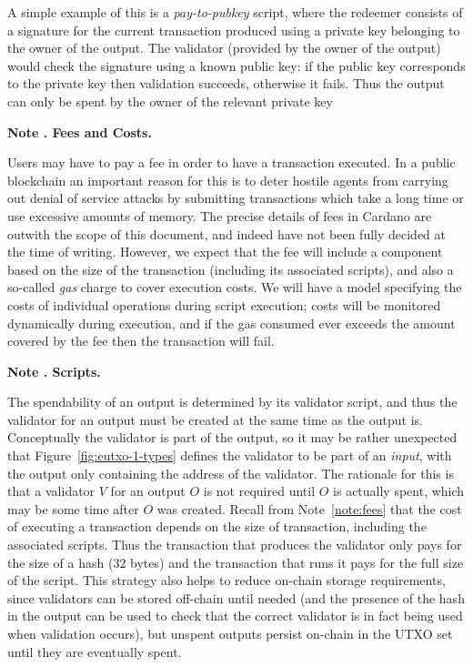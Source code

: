 \documentclass[a4paper]{article}
\newcounter{note}
\newcommand{\note}[1]{
  \bigskip
  \refstepcounter{note}
  \noindent\textbf{Note \thenote. #1}
}
\renewcommand{\i}{\textit}  %
\begin{document}
A simple example of this is a \i{pay-to-pubkey} script, where the
redeemer consists of a signature for the current transaction produced
using a private key belonging to the owner of the output.  The
validator (provided by the owner of the output) would check the
signature using a known public key: if the public key corresponds to
the private key then validation succeeds, otherwise it fails.  Thus
the output can only be spent by the owner of the relevant private key


\note{Fees and Costs.}
\label{note:fees}
Users may have to pay a fee in order to have a transaction executed.
In a public blockchain an important reason for this is to deter
hostile agents from carrying out denial of service attacks by
submitting transactions which take a long time or use excessive
amounts of memory.  The precise details of fees in Cardano are outwith
the scope of this document, and indeed have not been fully decided at
the time of writing. However, we expect that the fee will include a
component based on the size of the transaction (including its
associated scripts), and also a so-called \textit{gas} charge to cover
execution costs.  We will have a model specifying the costs of
individual operations during script execution; costs will be monitored
dynamically during execution, and if the gas consumed ever exceeds the
amount covered by the fee then the transaction will fail.

\note{Scripts.}
\label{note:scripts} The spendability of an output is determined by
its validator script, and thus the validator for an output must be
created at the same time as the output is.  Conceptually the validator
is  part of the output, so it may be rather unexpected that
Figure~\ref{fig:eutxo-1-types} defines the validator to be part of an
\textit{input}, with the output only containing the address of the
validator.  The rationale for this is that a validator $V$ for an
output $O$ is not required until $O$ is actually spent, which may be
some time after $O$ was created.  Recall from Note~\ref{note:fees} that the
cost of executing a transaction depends on the size of transaction,
including the associated scripts.  Thus the transaction that produces
the validator only pays for the size of a hash (32 bytes) and the
transaction that runs it pays for the full size of the script. This
strategy also helps to reduce on-chain storage requirements, since
validators can be stored off-chain until needed (and the presence of
the hash in the output can be used to check that the correct validator
is in fact being used when validation occurs), but unspent outputs
persist on-chain in the UTXO set until they are eventually spent.
\end{document}

